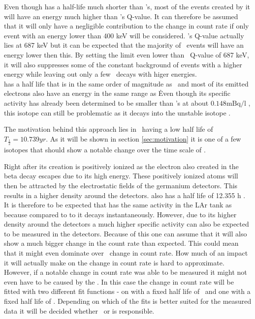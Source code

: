 \documentclass[encoding=utf8,british]{tumphthesis}
\begin{document}
Even though  has a half-life much shorter than \Kr's, most of the events created by it will have an energy much higher than \Kr's Q-value.
It can therefore be assumed that it will only have a negligible contribution to the change in count rate if only event with an energy lower than 400 keV will be considered.
\Kr's Q-value actually lies at 687 keV but it can be expected that the majority of \Kr\ events will have an energy lower then this.
By setting the limit even lower than \Kr\ Q-value of 687 keV, it will also suppresses some of the constant background of events with a higher energy while leaving out only a few \Kr\ decays with higer energies.
\\

 has a half life that is in the same order of magnitude as \Kr\ and most of its emitted electrons also have an energy in the same range as \Kr\.
Even though its specific activity has already been determined to be smaller than \Kr's at about $0.148\mathrm{mBq/l}$ \cite{becerici_schmidt_results_2014}, this isotope can still be problematic as it decays into the unstable isotope .





The motivation behind this approach lies in \Kr\ having a low half life of $T_{\frac{1}{2}} = 10.739\unit{yr}$.
As it will be shown in section \ref{sec:motivation} it is one of a few isotopes that should show a notable change over the time scale of \PII.









Right after its creation  is positively ionized as the electron also created in the beta decay escapes due to its high energy.
These positively ionized  atoms will then be attracted by the electrostatic fields of the germanium detectors.
This results in a higher  density around the detectors.
 also has a half life of 12.355 h \cite{chen_nuclear_2016}.
It is therefore to be expected that  has the same activity in the LAr tank as  because compared to to  it decays instantaneously.
However, due to its higher density around the detectors a much higher specific activity can also be expected to be measured in the detectors.
Because of this one can assume that it will also show a much bigger change in the count rate than expected.
This could mean that it might even dominate over \Kr\ change in count rate.
How much of an impact it will actually make on the change in count rate is hard to approximate.
However, if a notable change in count rate was able to be measured it might not even have to be caused by the \Kr.
In this case the change in count rate will be fitted with two different fit functions - on with a fixed half life of \Kr\ and one with a fixed half life of .
Depending on which of the fits is better suited for the measured data it will be decided whether \Kr\ or  is responsible. 
\end{document}
